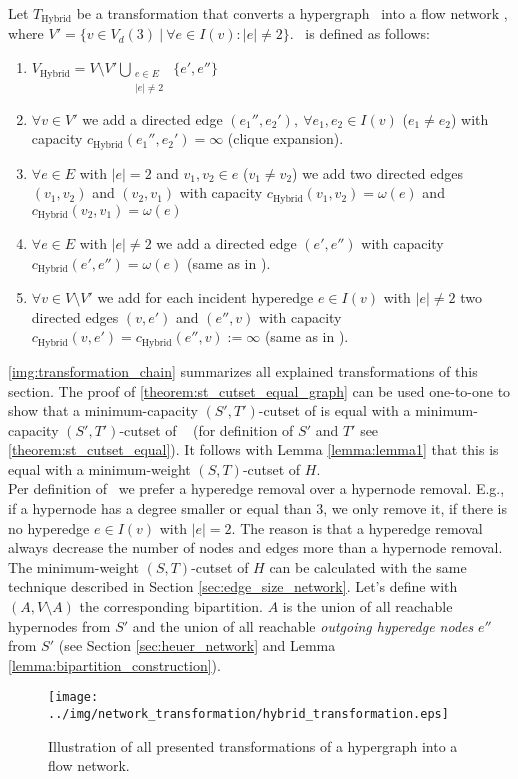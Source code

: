 \begin{definition}
Let $T_{\text{Hybrid}}$ be a transformation that converts a hypergraph \HypergraphDef~into 
a flow network \Hybrid, where $V' = \{v \in V_d(3)\ |\ \forall e \in I(v): |e| \neq 2\}$. 
\ShortHybrid~is defined as follows:
\begin{enumerate}
\item $V_{\text{Hybrid}} = V\setminus V' \bigcup\limits_{\substack{e \in E \\ |e| \neq 2}}\ \{e', e''\}$
\item $\forall v \in V'$ we add a directed edge $(e_1'', e_2'),\ \forall e_1, e_2 \in I(v)$ 
      ($e_1 \neq e_2$) with capacity $c_{\text{Hybrid}}(e_1'', e_2') = \infty$ (clique expansion).
\item $\forall e \in E$ with $|e| = 2$ and $v_1,v_2 \in e$ ($v_1 \neq v_2$) we add 
      two directed edges $(v_1,v_2)$ and $(v_2,v_1)$ with capacity $c_{\text{Hybrid}}(v_1,v_2) = \omega(e)$
      and $c_{\text{Hybrid}}(v_2,v_1) = \omega(e)$
\item $\forall e \in E$ with $|e| \neq 2$ we add a directed edge $(e',e'')$
      with capacity $c_{\text{Hybrid}}(e',e'') = \omega(e)$ (same as in ).
\item $\forall v \in V\setminus V'$ we add for each incident hyperedge $e \in I(v)$ with $|e| \neq 2$ 
      two directed edges $(v,e')$ and $(e'',v)$ with capacity 
      $c_{\text{Hybrid}}(v,e') = c_{\text{Hybrid}}(e'',v) := \infty$ (same as in ).
\end{enumerate} 
\end{definition}

\autoref{img:transformation_chain} summarizes all explained transformations of this section.
The proof of \autoref{theorem:st_cutset_equal_graph} can be used one-to-one to show that a minimum-capacity
$(S',T')$-cutset of  is equal with a minimum-capacity $(S',T')$-cutset of \ShortHybrid~
(for definition of $S'$ and $T'$ see \autoref{theorem:st_cutset_equal}). It follows with Lemma \ref{lemma:lemma1}
that this is equal with a minimum-weight $(S,T)$-cutset of $H$. \\
Per definition of \ShortHybrid~we prefer a hyperedge removal over a hypernode removal. E.g., if
a hypernode has a degree smaller or equal than $3$, we only remove it, if there is no hyperedge
$e \in I(v)$ with $|e| = 2$. The reason is that a hyperedge removal always decrease the number of nodes
and edges more than a hypernode removal. \\
The minimum-weight $(S,T)$-cutset of $H$ can be calculated with the same technique described in Section
\ref{sec:edge_size_network}. Let's define with $(A,V\setminus A)$ the corresponding bipartition.
$A$ is the union of all reachable hypernodes from $S'$ and the union of
all reachable \emph{outgoing hyperedge nodes} $e''$ from $S'$ (see Section \ref{sec:heuer_network} 
and Lemma \ref{lemma:bipartition_construction}). 

\begin{figure}
\centering
\texttt{[image: ../img/network\_transformation/hybrid\_transformation.eps]}
\caption{Illustration of all presented transformations of a hypergraph into a flow network.}
\label{img:transformation_chain}
\end{figure}
